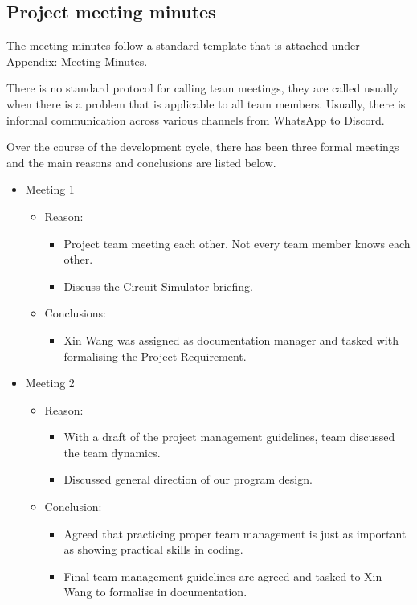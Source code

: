 \documentclass[12pt,a4paper]{article}
\begin{document}
	\vfill
	\pagebreak

	\subsection{Project meeting minutes}
	The meeting minutes follow a standard template that is attached under Appendix: Meeting Minutes. \par
	There is no standard protocol for calling team meetings, they are called usually when there is a problem
	that is applicable to all team members. Usually, there is informal communication across various channels from 
	WhatsApp to Discord. \par
	Over the course of the development cycle, there has been three formal meetings and the main reasons and conclusions
	are listed below.
	\begin{itemize}
		\item Meeting 1
		\begin{itemize}
			\item Reason: 
			\begin{itemize}
				\item Project team meeting each other. Not every team member knows each other.
				\item Discuss the Circuit Simulator briefing.
			\end{itemize}
			\item Conclusions:
			\begin{itemize}
				\item Xin Wang was assigned as documentation manager and tasked with formalising the Project Requirement.
			\end{itemize}
		\end{itemize}
		\item Meeting 2
		\begin{itemize}
			\item Reason:
			\begin{itemize}
				\item With a draft of the project management guidelines, team discussed the team dynamics.
				\item Discussed general direction of our program design.
			\end{itemize}
			\item Conclusion:
			\begin{itemize}
				\item Agreed that practicing proper team management is just as important as showing practical skills 
				in coding.
				\item Final team management guidelines are agreed and tasked to Xin Wang to formalise in documentation.

\end{itemize}
\end{itemize}
\end{itemize}
\end{document}
